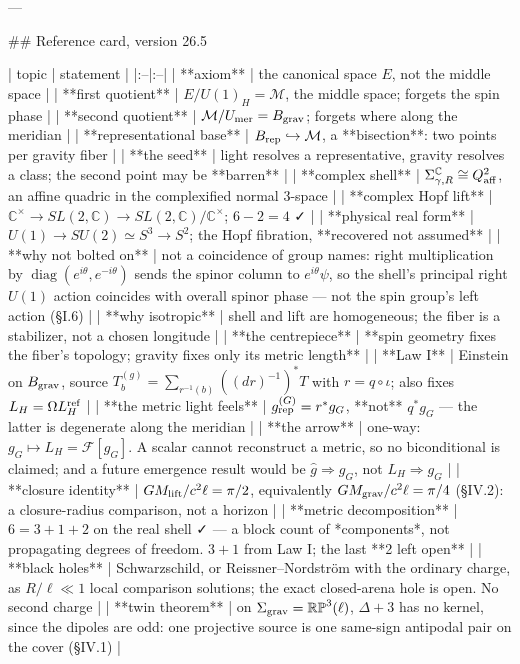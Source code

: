 ---

## Reference card, version 26.5

| topic | statement |
|:--|:--|
| **axiom** | the canonical space $E$, not the middle space |
| **first quotient** | $E/U(1)_H = \mathcal{M}$, the middle space; forgets the spin phase |
| **second quotient** | $\mathcal{M}/U_{\rm mer} = B_{\rm grav}$; forgets where along the meridian |
| **representational base** | $B_{\rm rep}\hookrightarrow\mathcal{M}$, a **bisection**: two points per gravity fiber |
| **the seed** | light resolves a representative, gravity resolves a class; the second point may be **barren** |
| **complex shell** | $\Sigma^\mathbb{C}_{\gamma,R}\cong Q^2_{\rm aff}$, an affine quadric in the complexified normal 3-space |
| **complex Hopf lift** | $\mathbb{C}^\times\to SL(2,\mathbb{C})\to SL(2,\mathbb{C})/\mathbb{C}^\times$; $6-2 = 4$ ✓ |
| **physical real form** | $U(1)\to SU(2)\simeq S^3\to S^2$; the Hopf fibration, **recovered not assumed** |
| **why not bolted on** | not a coincidence of group names: right multiplication by $\operatorname{diag}(e^{i\theta},e^{-i\theta})$ sends the spinor column to $e^{i\theta}\psi$, so the shell's principal right $U(1)$ action coincides with overall spinor phase — not the spin group's left action (§I.6) |
| **why isotropic** | shell and lift are homogeneous; the fiber is a stabilizer, not a chosen longitude |
| **the centrepiece** | **spin geometry fixes the fiber's topology; gravity fixes only its metric length** |
| **Law I** | Einstein on $B_{\rm grav}$, source $T^{(g)}_b = \sum_{r^{-1}(b)}((dr)^{-1})^*T$ with $r = q\circ\iota$; also fixes $L_H = \Omega L_H^{\rm ref}$ |
| **the metric light feels** | $g^{(G)}_{\rm rep} = r^*g_G$, **not** $q^*g_G$ — the latter is degenerate along the meridian |
| **the arrow** | one-way: $g_G\mapsto L_H = \mathcal{F}[g_G]$. A scalar cannot reconstruct a metric, so no biconditional is claimed; and a future emergence result would be $\hat g\Rightarrow g_G$, not $L_H\Rightarrow g_G$ |
| **closure identity** | $GM_{\rm lift}/c^2\ell = \pi/2$, equivalently $GM_{\rm grav}/c^2\ell = \pi/4$ (§IV.2): a closure-radius comparison, not a horizon |
| **metric decomposition** | $6 = 3+1+2$ on the real shell ✓ — a block count of *components*, not propagating degrees of freedom. $3+1$ from Law I; the last **2 left open** |
| **black holes** | Schwarzschild, or Reissner–Nordström with the ordinary charge, as $R/\ell\ll1$ local comparison solutions; the exact closed-arena hole is open. No second charge |
| **twin theorem** | on $\Sigma_{\rm grav} = \mathbb{RP}^3(\ell)$, $\Delta+3$ has no kernel, since the dipoles are odd: one projective source is one same-sign antipodal pair on the cover (§IV.1) |
